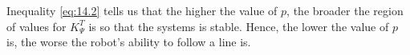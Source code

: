 Inequality \ref{eq:14.2} tells us that the higher the value of $p$, the broader
the region of values for $K_{\Psi}^T$ is so that the systems is stable. Hence,
the lower the value of $p$ is, the worse the robot's ability to follow a line
is.
